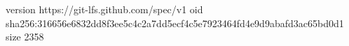 version https://git-lfs.github.com/spec/v1
oid sha256:316656e6832dd8f3ee5c4c2a7dd5ecf4c5e7923464fd4e9d9abafd3ac65bd0d1
size 2358
